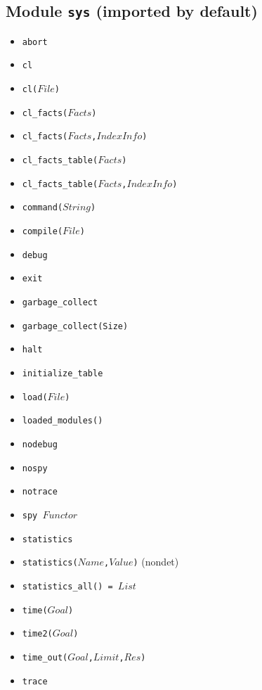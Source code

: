 \documentclass[10pt]{article}
\begin{document}
\begin{multicols}{2}
\section*{Module \texttt{sys} (imported by default)}
\begin{scriptsize}
\begin{itemize}
    \item \texttt{abort}
    \item \texttt{cl}
    \item \texttt{cl($File$)}
    \item \texttt{cl\_facts($Facts$)}
    \item \texttt{cl\_facts($Facts$,$IndexInfo$)}
    \item \texttt{cl\_facts\_table($Facts$)}
    \item \texttt{cl\_facts\_table($Facts$,$IndexInfo$)}
    \item \texttt{command($String$)}
    \item \texttt{compile($File$)}
    \item \texttt{debug}
    \item \texttt{exit}
    \item \texttt{garbage\_collect}
    \item \texttt{garbage\_collect(Size)}
    \item \texttt{halt}
    \item \texttt{initialize\_table}
    \item \texttt{load($File$)}
    \item \texttt{loaded\_modules()}
    \item \texttt{nodebug}
    \item \texttt{nospy}
    \item \texttt{notrace}
    \item \texttt{spy $Functor$}
    \item \texttt{statistics}
    \item \texttt{statistics($Name$,$Value$)} (nondet)
    \item \texttt{statistics\_all() = $List$}
    \item \texttt{time($Goal$)}
    \item \texttt{time2($Goal$)}
    \item \texttt{time\_out($Goal$,$Limit$,$Res$)}
    \item \texttt{trace}
\end{itemize}
\end{scriptsize}

\end{multicols}
\end{document}
